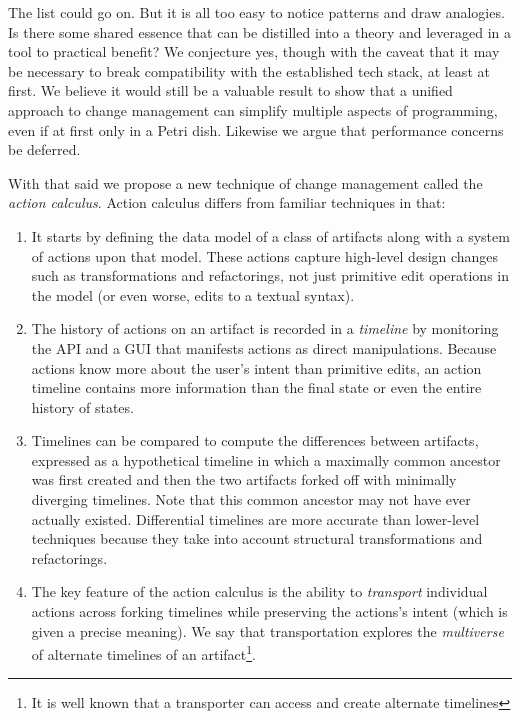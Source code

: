\documentclass[english,submission]{programming}
\theoremstyle{definition}
\begin{document}
\medskip
The list could go on. But it is all too easy to notice patterns and draw analogies. Is there some shared essence that can be distilled into a theory and leveraged in a tool to practical benefit? We conjecture yes, though with the caveat that it may be necessary to break compatibility with the established tech stack, at least at first. We believe it would still be a valuable result to show that a unified approach to change management can  simplify multiple aspects of programming, even if at first only in a Petri dish.
Likewise we argue that performance concerns be deferred.

With that said we propose a new technique of change management called the \textit{action calculus}. Action calculus differs from familiar techniques in that:
\begin{enumerate}

  \item It starts by defining the data model of a class of artifacts along with a system of actions upon that model. These actions capture high-level design changes such as transformations and refactorings, not just primitive edit operations in the model (or even worse, edits to a textual syntax).

  \item The history of actions on an artifact is recorded in a \textit{timeline} by monitoring the API and a GUI that manifests actions as direct manipulations.
  Because actions know more about the user's intent than primitive edits, an action timeline contains more information than the final state or even the entire history of states.

  \item Timelines can be compared to compute the differences between artifacts, expressed as a hypothetical timeline in which a maximally common ancestor was first created and then the two artifacts forked off with minimally diverging timelines. Note that this common ancestor may not have ever actually existed.
  Differential timelines are more accurate than lower-level techniques because they take into account structural transformations and refactorings.

  \item The key feature of the action calculus is the ability to \textit{transport} individual actions across forking timelines while preserving the actions's intent (which is given a precise meaning).
  We say that transportation explores the \textit{multiverse} of alternate timelines of an artifact\footnote{It is well known that a transporter can access and create alternate timelines\cite{mirrormirror}}.


\end{enumerate}
\end{document}
